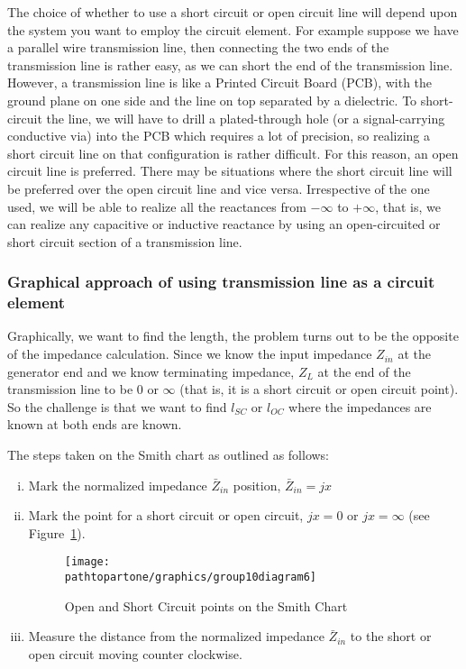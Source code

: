 The choice of whether to use a short circuit or open circuit line will depend upon the system you want to employ the circuit element. For example suppose we have a parallel wire transmission line, then connecting the two ends of the transmission line is rather easy, as we can short the end of the transmission line. However, a transmission line is like a Printed Circuit Board (PCB), with the ground plane on one side and the line on top separated by a dielectric. To short-circuit the line, we will have to drill a plated-through hole (or a signal-carrying conductive via) into the PCB which requires a lot of precision, so realizing a short circuit line on that configuration is rather difficult. For this reason, an open circuit line is preferred. There may be situations where the short circuit line will be preferred over the open circuit line and vice versa. Irrespective of the one used, we will be able to realize all the reactances from $ -\infty$ to $+\infty $, that is, we can realize any capacitive or inductive reactance by using an open-circuited or short circuit section of a transmission line.

\subsubsection{Graphical approach of using transmission line as a circuit element}
Graphically, we want to find the length, the problem turns out to be the opposite of the impedance calculation. Since we know the input impedance $Z_{in}$ at the generator end and we know terminating impedance, $Z_{L}$ at the end of the transmission line to be 0 or $\infty$ (that is, it is a short circuit or open circuit point). So the challenge is that we want to find $ l_{SC} $ or $ l_{OC} $ where the impedances are known at both ends are known.

The steps taken on the Smith chart as outlined as follows:
\begin{enumerate}[(i)]
\item Mark the normalized impedance $\bar{Z}_{in}$ position, $\bar{Z}_{in} = jx$
\item Mark the point for a short circuit or open circuit, $jx = 0$ or $jx = \infty$ (see Figure~\ref{fig:group10diagram6}).
\begin{figure}[h]
\centering
\texttt{[image: \\pathtopartone/graphics/group10diagram6]}
\caption{Open and Short Circuit points on the Smith Chart}
\label{fig:group10diagram6}
\end{figure}

\item Measure the distance from the normalized impedance $\bar{Z}_{in}$ to the short or open circuit moving counter clockwise. 
\end{enumerate}

